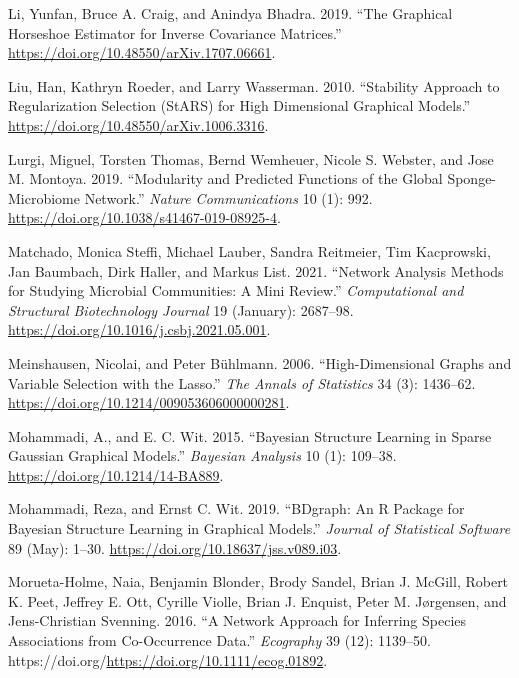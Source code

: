 \documentclass[
  a4paper,
]{article}
\newlength{\cslhangindent}
\newlength{\cslentryspacingunit} %
\newenvironment{CSLReferences}[2] %
 {%
  \setlength{\parindent}{0pt}
  \ifodd #1
  \let\oldpar\par
  \def\par{\hangindent=\cslhangindent\oldpar}
  \fi
  \setlength{\parskip}{#2\cslentryspacingunit}
 }%
 {}
\begin{document}
\begin{CSLReferences}{1}{0}
\leavevmode{}%
Li, Yunfan, Bruce A. Craig, and Anindya Bhadra. 2019. {``The Graphical
Horseshoe Estimator for Inverse Covariance Matrices.''}
\url{https://doi.org/10.48550/arXiv.1707.06661}.

\leavevmode{}%
Liu, Han, Kathryn Roeder, and Larry Wasserman. 2010. {``Stability
Approach to Regularization Selection (StARS) for High Dimensional
Graphical Models.''} \url{https://doi.org/10.48550/arXiv.1006.3316}.

\leavevmode{}%
Lurgi, Miguel, Torsten Thomas, Bernd Wemheuer, Nicole S. Webster, and
Jose M. Montoya. 2019. {``Modularity and Predicted Functions of the
Global Sponge-Microbiome Network.''} \emph{Nature Communications} 10
(1): 992. \url{https://doi.org/10.1038/s41467-019-08925-4}.

\leavevmode{}%
Matchado, Monica Steffi, Michael Lauber, Sandra Reitmeier, Tim
Kacprowski, Jan Baumbach, Dirk Haller, and Markus List. 2021. {``Network
Analysis Methods for Studying Microbial Communities: A Mini Review.''}
\emph{Computational and Structural Biotechnology Journal} 19 (January):
2687--98. \url{https://doi.org/10.1016/j.csbj.2021.05.001}.

\leavevmode{}%
Meinshausen, Nicolai, and Peter Bühlmann. 2006. {``High-Dimensional
Graphs and Variable Selection with the Lasso.''} \emph{The Annals of
Statistics} 34 (3): 1436--62.
\url{https://doi.org/10.1214/009053606000000281}.

\leavevmode{}%
Mohammadi, A., and E. C. Wit. 2015. {``Bayesian Structure Learning in
Sparse Gaussian Graphical Models.''} \emph{Bayesian Analysis} 10 (1):
109--38. \url{https://doi.org/10.1214/14-BA889}.

\leavevmode{}%
Mohammadi, Reza, and Ernst C. Wit. 2019. {``BDgraph: An R Package for
Bayesian Structure Learning in Graphical Models.''} \emph{Journal of
Statistical Software} 89 (May): 1--30.
\url{https://doi.org/10.18637/jss.v089.i03}.

\leavevmode{}%
Morueta-Holme, Naia, Benjamin Blonder, Brody Sandel, Brian J. McGill,
Robert K. Peet, Jeffrey E. Ott, Cyrille Violle, Brian J. Enquist, Peter
M. Jørgensen, and Jens-Christian Svenning. 2016. {``A Network Approach
for Inferring Species Associations from Co-Occurrence Data.''}
\emph{Ecography} 39 (12): 1139--50.
https://doi.org/\url{https://doi.org/10.1111/ecog.01892}.


\end{CSLReferences}
\end{document}
